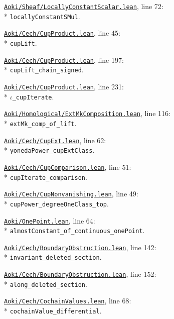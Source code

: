 \begin{leansources}
\item \href{../../../lean/Aoki/Sheaf/LocallyConstantScalar.lean}{\nolinkurl{Aoki/Sheaf/LocallyConstantScalar.lean}}, line 72:\\*
\nolinkurl{locallyConstantSMul}.
\item \href{../../../lean/Aoki/Cech/CupProduct.lean}{\nolinkurl{Aoki/Cech/CupProduct.lean}}, line 45:\\*
\nolinkurl{cupLift}.
\item \href{../../../lean/Aoki/Cech/CupProduct.lean}{\nolinkurl{Aoki/Cech/CupProduct.lean}}, line 197:\\*
\nolinkurl{cupLift_chain_signed}.
\item \href{../../../lean/Aoki/Cech/CupProduct.lean}{\nolinkurl{Aoki/Cech/CupProduct.lean}}, line 231:\\*
\(\iota\)\nolinkurl{_cupIterate}.
\item \href{../../../lean/Aoki/Homological/ExtMkComposition.lean}{\nolinkurl{Aoki/Homological/ExtMkComposition.lean}}, line 116:\\*
\nolinkurl{extMk_comp_of_lift}.
\item \href{../../../lean/Aoki/Cech/CupExt.lean}{\nolinkurl{Aoki/Cech/CupExt.lean}}, line 62:\\*
\nolinkurl{yonedaPower_cupExtClass}.
\item \href{../../../lean/Aoki/Cech/CupComparison.lean}{\nolinkurl{Aoki/Cech/CupComparison.lean}}, line 51:\\*
\nolinkurl{cupIterate_comparison}.
\item \href{../../../lean/Aoki/Cech/CupNonvanishing.lean}{\nolinkurl{Aoki/Cech/CupNonvanishing.lean}}, line 49:\\*
\nolinkurl{cupPower_degreeOneClass_top}.
\end{leansources}

\begin{leansources}
\item \href{../../../lean/Aoki/OnePoint.lean}{\nolinkurl{Aoki/OnePoint.lean}}, line 64:\\*
\nolinkurl{almostConstant_of_continuous_onePoint}.
\item \href{../../../lean/Aoki/Cech/BoundaryObstruction.lean}{\nolinkurl{Aoki/Cech/BoundaryObstruction.lean}}, line 142:\\*
\nolinkurl{invariant_deleted_section}.
\item \href{../../../lean/Aoki/Cech/BoundaryObstruction.lean}{\nolinkurl{Aoki/Cech/BoundaryObstruction.lean}}, line 152:\\*
\nolinkurl{along_deleted_section}.
\item \href{../../../lean/Aoki/Cech/CochainValues.lean}{\nolinkurl{Aoki/Cech/CochainValues.lean}}, line 68:\\*
\nolinkurl{cochainValue_differential}.
\end{leansources}

